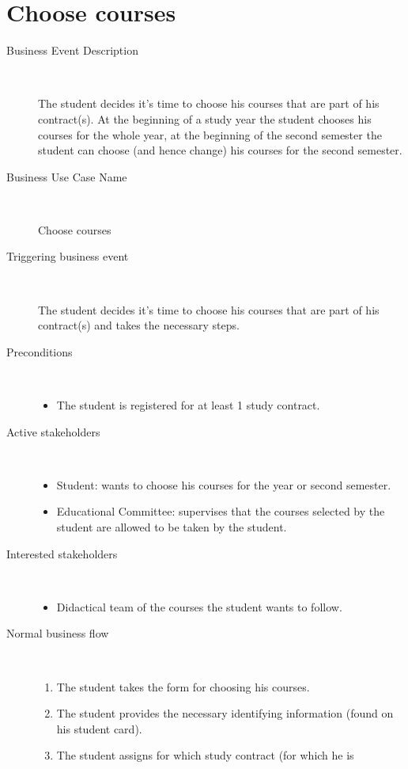 \section{Choose courses}

\begin{description}
	\item[Business Event Description] \ 
		\par The student decides it's time to choose his courses that are part of his
		contract(s). At the beginning of a study year the student chooses his courses
		for the whole year, at the beginning of the second semester the student can
		choose (and hence change) his courses for the second semester.
	\item[Business Use Case Name] \ 
		\par Choose courses
	\item[Triggering business event] \ 
		\par The student decides it's time to choose his courses that are part of his
		contract(s) and takes the necessary steps.
	\item[Preconditions] \
	\begin{itemize}
		\item The student is registered for at least 1 study contract.
	\end{itemize}
	\item[Active stakeholders] \ 
	\begin{itemize}
		\item Student: wants to choose his courses for the year or second semester.
		\item Educational Committee: supervises that the courses selected by the
		student are allowed to be taken by the student.
	\end{itemize}
	\item[Interested stakeholders] \ 
	\begin{itemize}
		\item Didactical team of the courses the student wants to follow.
	\end{itemize}
	\item[Normal business flow] \
	\begin{enumerate}
	  	\item The student takes the form for choosing his courses.
	  	\item The student provides the necessary identifying information (found on
	  	his student card). 
	  	\item The student assigns for which study contract (for which he is

\end{enumerate}
\end{description}
